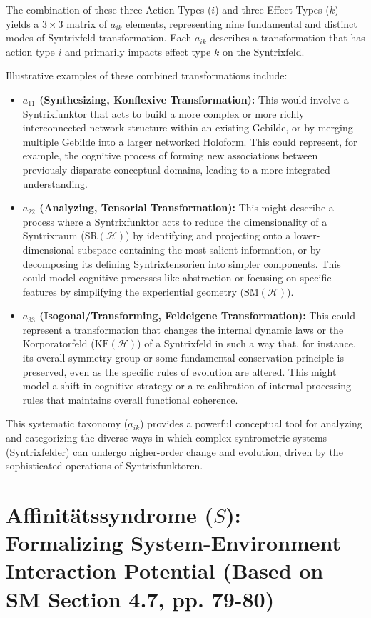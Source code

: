 \documentclass[
    12pt,              %
    a4paper,           %
    headings=normal,   %
    twoside=true,      %
    BCOR=8mm,          %
]{scrbook}
\newcommand{\affinitaetssyndrom}{S}
\begin{document}
The combination of these three Action Types (\(i\)) and three Effect Types (\(k\)) yields a \(3 \times 3\) matrix of \(a_{ik}\) elements, representing nine fundamental and distinct modes of Syntrixfeld transformation. Each \(a_{ik}\) describes a transformation that has action type \(i\) and primarily impacts effect type \(k\) on the Syntrixfeld.

Illustrative examples of these combined transformations include:
\begin{itemize}
    \item   \textbf{\(a_{11}\) (Synthesizing, Konflexive Transformation):} This would involve a Syntrixfunktor that acts to build a more complex or more richly interconnected network structure within an existing Gebilde, or by merging multiple Gebilde into a larger networked Holoform. This could represent, for example, the cognitive process of forming new associations between previously disparate conceptual domains, leading to a more integrated understanding.
    \item   \textbf{\(a_{22}\) (Analyzing, Tensorial Transformation):} This might describe a process where a Syntrixfunktor acts to reduce the dimensionality of a Syntrixraum (\(\text{SR}(\mathcal{H})\)) by identifying and projecting onto a lower-dimensional subspace containing the most salient information, or by decomposing its defining Syntrixtensorien into simpler components. This could model cognitive processes like abstraction or focusing on specific features by simplifying the experiential geometry (\(\text{SM}(\mathcal{H})\)).
    \item   \textbf{\(a_{33}\) (Isogonal/Transforming, Feldeigene Transformation):} This could represent a transformation that changes the internal dynamic laws or the Korporatorfeld (\(\text{KF}(\mathcal{H})\)) of a Syntrixfeld in such a way that, for instance, its overall symmetry group or some fundamental conservation principle is preserved, even as the specific rules of evolution are altered. This might model a shift in cognitive strategy or a re-calibration of internal processing rules that maintains overall functional coherence.
\end{itemize}
This systematic taxonomy (\(a_{ik}\)) provides a powerful conceptual tool for analyzing and categorizing the diverse ways in which complex syntrometric systems (Syntrixfelder) can undergo higher-order change and evolution, driven by the sophisticated operations of Syntrixfunktoren.
\section{Affinitätssyndrome (\(\affinitaetssyndrom\)): Formalizing System-Environment Interaction Potential (Based on SM Section 4.7, pp. 79-80)}
\label{sec:ch4_affinitaetssyndrome_overall_revised} 
\end{document}
